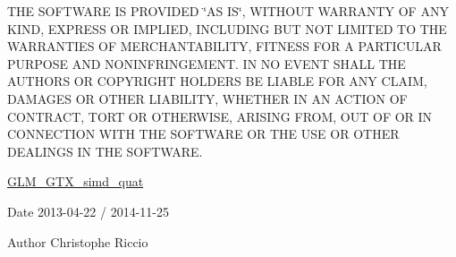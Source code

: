 T\-H\-E S\-O\-F\-T\-W\-A\-R\-E I\-S P\-R\-O\-V\-I\-D\-E\-D \char`\"{}\-A\-S I\-S\char`\"{}, W\-I\-T\-H\-O\-U\-T W\-A\-R\-R\-A\-N\-T\-Y O\-F A\-N\-Y K\-I\-N\-D, E\-X\-P\-R\-E\-S\-S O\-R I\-M\-P\-L\-I\-E\-D, I\-N\-C\-L\-U\-D\-I\-N\-G B\-U\-T N\-O\-T L\-I\-M\-I\-T\-E\-D T\-O T\-H\-E W\-A\-R\-R\-A\-N\-T\-I\-E\-S O\-F M\-E\-R\-C\-H\-A\-N\-T\-A\-B\-I\-L\-I\-T\-Y, F\-I\-T\-N\-E\-S\-S F\-O\-R A P\-A\-R\-T\-I\-C\-U\-L\-A\-R P\-U\-R\-P\-O\-S\-E A\-N\-D N\-O\-N\-I\-N\-F\-R\-I\-N\-G\-E\-M\-E\-N\-T. I\-N N\-O E\-V\-E\-N\-T S\-H\-A\-L\-L T\-H\-E A\-U\-T\-H\-O\-R\-S O\-R C\-O\-P\-Y\-R\-I\-G\-H\-T H\-O\-L\-D\-E\-R\-S B\-E L\-I\-A\-B\-L\-E F\-O\-R A\-N\-Y C\-L\-A\-I\-M, D\-A\-M\-A\-G\-E\-S O\-R O\-T\-H\-E\-R L\-I\-A\-B\-I\-L\-I\-T\-Y, W\-H\-E\-T\-H\-E\-R I\-N A\-N A\-C\-T\-I\-O\-N O\-F C\-O\-N\-T\-R\-A\-C\-T, T\-O\-R\-T O\-R O\-T\-H\-E\-R\-W\-I\-S\-E, A\-R\-I\-S\-I\-N\-G F\-R\-O\-M, O\-U\-T O\-F O\-R I\-N C\-O\-N\-N\-E\-C\-T\-I\-O\-N W\-I\-T\-H T\-H\-E S\-O\-F\-T\-W\-A\-R\-E O\-R T\-H\-E U\-S\-E O\-R O\-T\-H\-E\-R D\-E\-A\-L\-I\-N\-G\-S I\-N T\-H\-E S\-O\-F\-T\-W\-A\-R\-E.

\hyperlink{group__gtx__simd__quat}{G\-L\-M\-\_\-\-G\-T\-X\-\_\-simd\-\_\-quat}

\begin{DoxyDate}{Date}
2013-\/04-\/22 / 2014-\/11-\/25 
\end{DoxyDate}
\begin{DoxyAuthor}{Author}
Christophe Riccio 
\end{DoxyAuthor}
